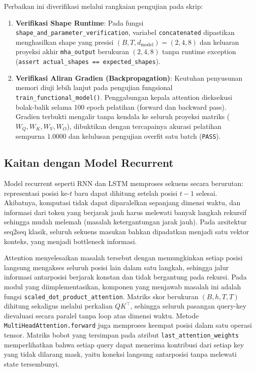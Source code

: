 \documentclass[12pt,a4paper]{article}
\newcommand{\code}[1]{\texttt{\small #1}}
\begin{document}
Perbaikan ini diverifikasi melalui rangkaian pengujian pada skrip:
\begin{enumerate}
    \item \textbf{Verifikasi Shape Runtime}: Pada fungsi \code{shape\_and\_parameter\_verification}, variabel \code{concatenated} dipastikan menghasilkan shape yang presisi $(B, T, d_{\text{model}}) = (2, 4, 8)$ dan keluaran proyeksi akhir \code{mha\_output} berukuran $(2, 4, 8)$ tanpa runtime exception (\code{assert actual\_shapes == expected\_shapes}).
    \item \textbf{Verifikasi Aliran Gradien (Backpropagation)}: Keutuhan penyusunan memori diuji lebih lanjut pada pengujian fungsional \code{train\_functional\_model()}. Penggabungan kepala attention dieksekusi bolak-balik selama 100 epoch pelatihan (forward dan backward pass). Gradien terbukti mengalir tanpa kendala ke seluruh proyeksi matriks ($W_Q, W_K, W_V, W_O$), dibuktikan dengan tercapainya akurasi pelatihan sempurna $1.0000$ dan kelulusan pengujian overfit satu batch (\code{PASS}).
\end{enumerate}

\subsection{Kaitan dengan Model Recurrent}
Model recurrent seperti RNN dan LSTM memproses sekuens secara berurutan: representasi posisi ke-$t$ baru dapat dihitung setelah posisi $t-1$ selesai. Akibatnya, komputasi tidak dapat diparalelkan sepanjang dimensi waktu, dan informasi dari token yang berjarak jauh harus melewati banyak langkah rekursif sehingga mudah melemah (masalah ketergantungan jarak jauh). Pada arsitektur seq2seq klasik, seluruh sekuens masukan bahkan dipadatkan menjadi satu vektor konteks, yang menjadi bottleneck informasi.

Attention menyelesaikan masalah tersebut dengan memungkinkan setiap posisi langsung mengakses seluruh posisi lain dalam satu langkah, sehingga jalur informasi antarposisi berjarak konstan dan tidak bergantung pada rekursi. Pada modul yang diimplementasikan, komponen yang menjawab masalah ini adalah fungsi \code{scaled\_dot\_product\_attention}. Matriks skor berukuran $(B,h,T,T)$ dihitung sekaligus melalui perkalian $QK^\top$, sehingga seluruh pasangan query-key dievaluasi secara paralel tanpa loop atas dimensi waktu. Metode \code{MultiHeadAttention.forward} juga memproses keempat posisi dalam satu operasi tensor. Matriks bobot yang tersimpan pada atribut \code{last\_attention\_weights} memperlihatkan bahwa setiap query dapat menerima kontribusi dari setiap key yang tidak dilarang mask, yaitu koneksi langsung antarposisi tanpa melewati state tersembunyi.
\end{document}
